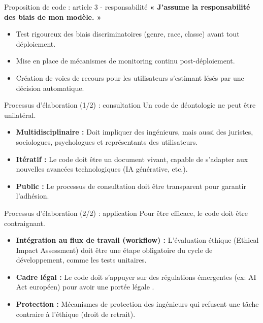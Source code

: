 \documentclass[9pt, aspectratio=169]{beamer}
\begin{document}
\begin{frame}{Proposition de code : article 3 - responsabilité}
    \textbf{« J'assume la responsabilité des biais de mon modèle. »}
    \vspace{0.5cm}
    \begin{itemize}
        \item Test rigoureux des biais discriminatoires (genre, race, classe) avant tout déploiement.
        \item Mise en place de mécanismes de monitoring continu post-déploiement.
        \item Création de voies de recours pour les utilisateurs s'estimant lésés par une décision automatique.
    \end{itemize}
\end{frame}

\begin{frame}{Processus d'élaboration (1/2) : consultation}
    Un code de déontologie ne peut être unilatéral.
    \begin{itemize}
        \item \textbf{Multidisciplinaire :} Doit impliquer des ingénieurs, mais aussi des juristes, sociologues, psychologues et représentants des utilisateurs.
        \item \textbf{Itératif :} Le code doit être un document vivant, capable de s'adapter aux nouvelles avancées technologiques (IA générative, etc.).
        \item \textbf{Public :} Le processus de consultation doit être transparent pour garantir l'adhésion.
    \end{itemize}
\end{frame}

\begin{frame}{Processus d'élaboration (2/2) : application}
    Pour être efficace, le code doit être contraignant.
    \begin{itemize}
        \item \textbf{Intégration au flux de travail (workflow) :} L'évaluation éthique (Ethical Impact Assessment) doit être une étape obligatoire du cycle de développement, comme les tests unitaires.
        \item \textbf{Cadre légal :} Le code doit s'appuyer sur des régulations émergentes (ex: AI Act européen) pour avoir une portée légale \parencite{NeuerPoint}.
        \item \textbf{Protection :} Mécanismes de protection des ingénieurs qui refusent une tâche contraire à l'éthique (droit de retrait).
    \end{itemize}
\end{frame}
\end{document}
